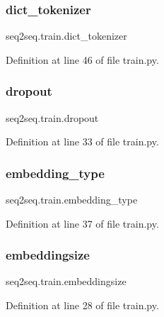 \subsubsection{\texorpdfstring{dict\+\_\+tokenizer}{dict\_tokenizer}}
{\footnotesize\ttfamily seq2seq.\+train.\+dict\+\_\+tokenizer}



Definition at line 46 of file train.\+py.

\mbox{\label{namespaceseq2seq_1_1train_a6ce0f888cec4261959cc61cc80a5cfd4}} 
\subsubsection{\texorpdfstring{dropout}{dropout}}
{\footnotesize\ttfamily seq2seq.\+train.\+dropout}



Definition at line 33 of file train.\+py.

\mbox{\label{namespaceseq2seq_1_1train_ae607c209cdec45923aaeef6318debcf2}} 
\subsubsection{\texorpdfstring{embedding\+\_\+type}{embedding\_type}}
{\footnotesize\ttfamily seq2seq.\+train.\+embedding\+\_\+type}



Definition at line 37 of file train.\+py.

\mbox{\label{namespaceseq2seq_1_1train_aa75e740b92949753f03b6f8a886b4722}} 
\subsubsection{\texorpdfstring{embeddingsize}{embeddingsize}}
{\footnotesize\ttfamily seq2seq.\+train.\+embeddingsize}



Definition at line 28 of file train.\+py.

